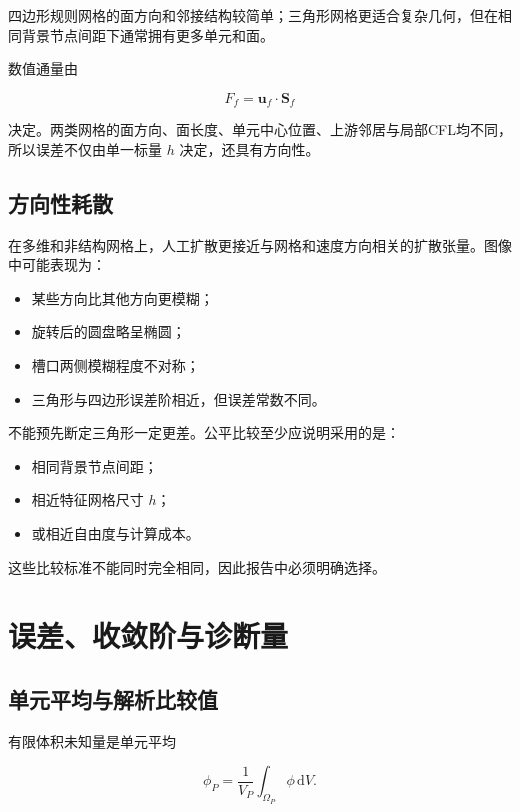 \documentclass[UTF8,12pt,a4paper,fontset=fandol]{ctexart}
\numberwithin{equation}{section}
\newcommand{\dd}{\,\mathrm d}
\newcommand{\Sf}{\bm S}
\begin{document}
四边形规则网格的面方向和邻接结构较简单；三角形网格更适合复杂几何，但在相同背景节点间距下通常拥有更多单元和面。

数值通量由

\begin{equation}
  F_f=\bm u_f\cdot\Sf_f
\end{equation}

决定。两类网格的面方向、面长度、单元中心位置、上游邻居与局部CFL均不同，所以误差不仅由单一标量 $h$ 决定，还具有方向性。

\subsection{方向性耗散}

在多维和非结构网格上，人工扩散更接近与网格和速度方向相关的扩散张量。图像中可能表现为：

\begin{itemize}
  \item 某些方向比其他方向更模糊；
  \item 旋转后的圆盘略呈椭圆；
  \item 槽口两侧模糊程度不对称；
  \item 三角形与四边形误差阶相近，但误差常数不同。
\end{itemize}

不能预先断定三角形一定更差。公平比较至少应说明采用的是：

\begin{itemize}
  \item 相同背景节点间距；
  \item 相近特征网格尺寸 $h$；
  \item 或相近自由度与计算成本。
\end{itemize}

这些比较标准不能同时完全相同，因此报告中必须明确选择。

\section{误差、收敛阶与诊断量}

\subsection{单元平均与解析比较值}

有限体积未知量是单元平均

\begin{equation}
  \phi_P
  =
  \frac1{V_P}\int_{\Omega_P}\phi\dd V.
\end{equation}
\end{document}
